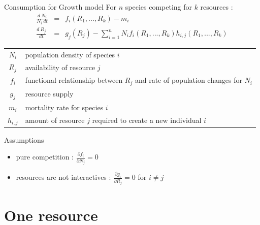 \documentclass[final,xcolor=dvipsnames]{beamer}
\begin{document}
\begin{frame}{Consumption for Growth model}
For $n$ species competing for $k$ resources :
  \begin{eqnarray}
  \frac{d~N_i}{N_i~dt}&=&f_i(R_1,...,R_k) - m_i \\
  \frac{d~R_j}{dt}&=&g_j(R_j)-\sum\limits_{i=1}^n N_i f_i(R_1,...,R_k) h_{i,j}(R_1,...,R_k)
  \end{eqnarray}
  \begin{tabular}{c p{10cm}}
  $N_i$ & population density of species $i$\\
  $R_j$ & availability of resource $j$ \\
  $f_i$ & functional relationship between $R_j$ and rate of population changes for $N_i$ \\
  $g_j$ & resource supply \\
  $m_i$ & mortality rate for species $i$ \\
  $h_{i,j}$ & amount of resource $j$ required to create a new individual $i$
  \end{tabular}
\end{frame}


\begin{frame}{Assumptions}
\begin{itemize}
\item pure competition : $\frac{\partial f_i}{\partial N_j}=0$
\item resources are not interactives : $\frac{\partial g_i}{\partial R_j}=0$ for $i\neq j$
\end{itemize}
\end{frame}

\section{One resource}
\end{document}
